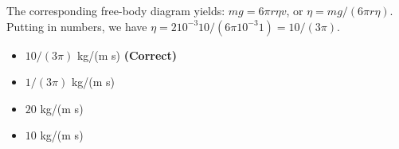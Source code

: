 \documentclass[10pt]{article}
\begin{document}
\begin{enumerate}
The corresponding free-body diagram yields: $mg = 6\pi r\eta v$, or $\eta = mg/(6\pi r \eta)$.  Putting in numbers, we have $\eta = 2 10^{-3} 10 / (6\pi 10^{-3} 1) = 10/(3\pi)$.
\begin{itemize}
\item $10/(3\pi)$ kg/(m s) \textbf{(Correct)}
\item $1/(3\pi)$ kg/(m s)
\item $20$ kg/(m s)
\item $10$ kg/(m s)
\end{itemize}
\end{enumerate}
\end{document}
